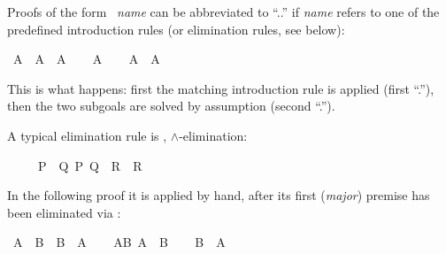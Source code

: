 \begin{isabellebody}
\begin{isamarkuptext}
Proofs of the form ~\emph{name}\isa{{\isacharparenright}}
can be abbreviated to ``..''  if \emph{name} refers to one of the
predefined introduction rules (or elimination rules, see below):%
\end{isamarkuptext}%
\isamarkuptrue%
\isamarkupfalse%
\ {\isachardoublequoteopen}A\ {\isasymlongrightarrow}\ A\ {\isasymand}\ A{\isachardoublequoteclose}\isanewline
%
\isadelimproof
%
\endisadelimproof
%
\isatagproof
{}\isamarkupfalse%
\isanewline
\ \ \isamarkupfalse%
\ {\isachardoublequoteopen}A{\isachardoublequoteclose}\isanewline
\ \ \isamarkupfalse%
\ {\isachardoublequoteopen}A\ {\isasymand}\ A{\isachardoublequoteclose}\ \isacommand{{\isachardot}{\isachardot}}\isamarkupfalse%
\isanewline
{}\isamarkupfalse%
%
\endisatagproof
{\isafoldproof}%
%
\isadelimproof
%
\endisadelimproof
%
\begin{isamarkuptext}%
\noindent
This is what happens: first the matching introduction rule 
is applied (first ``.''), then the two subgoals are solved by assumption
(second ``.'').%
\end{isamarkuptext}%
\isamarkuptrue%
%
\isamarkuptrue%
%
\begin{isamarkuptext}%
A typical elimination rule is , $\land$-elimination:
\begin{isabelle}%
\ \ \ \ \ {\isasymlbrakk}{\isacharquery}P\ {\isasymand}\ {\isacharquery}Q{\isacharsemicolon}\ {\isasymlbrakk}{\isacharquery}P{\isacharsemicolon}\ {\isacharquery}Q{\isasymrbrakk}\ {\isasymLongrightarrow}\ {\isacharquery}R{\isasymrbrakk}\ {\isasymLongrightarrow}\ {\isacharquery}R%
\end{isabelle}  In the following proof it is applied
by hand, after its first (\emph{major}) premise has been eliminated via
:%
\end{isamarkuptext}%
\isamarkuptrue%
\isamarkupfalse%
\ {\isachardoublequoteopen}A\ {\isasymand}\ B\ {\isasymlongrightarrow}\ B\ {\isasymand}\ A{\isachardoublequoteclose}\isanewline
%
\isadelimproof
%
\endisadelimproof
%
\isatagproof
{}\isamarkupfalse%
\isanewline
\ \ \isamarkupfalse%
\ AB{\isacharcolon}\ {\isachardoublequoteopen}A\ {\isasymand}\ B{\isachardoublequoteclose}\isanewline
\ \ \isamarkupfalse%
\ {\isachardoublequoteopen}B\ {\isasymand}\ A{\isachardoublequoteclose}\isanewline

\end{isabellebody}
